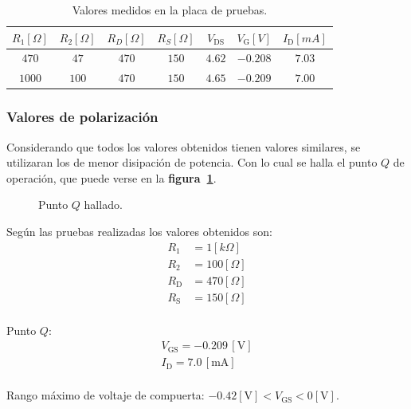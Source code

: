 \begin{table}[!h]
\begin{center}
    \begin{tabular}{|c|c|c|c||c||c|c|}
    \hline
    $R_1[\Omega]$ & $R_2[\Omega]$ & $R_D[\Omega]$ & $R_S[\Omega]$ &
    $V_{\text{DS}}$ & $V_{\text{G}}[V]$ & $I_{\text{D}}[mA]$
    \tabularnewline \hline \hline
    $ 470$ & $ 47$ & $470$ & $150$ & $4.62$ & $-0.208$ & $7.03$ \tabularnewline \hline
    $1000$ & $100$ & $470$ & $150$ & $4.65$ & $-0.209$ & $7.00$ \tabularnewline \hline
    \end{tabular}
\end{center}
\caption{Valores medidos en la placa de pruebas.}
\label{cuadro12}
\end{table}

\subsubsection{Valores de polarización}
Considerando que todos los valores obtenidos tienen valores similares, se
utilizaran los de menor disipación de potencia. Con lo cual se halla el punto
$Q$ de operación, que puede verse en la \textbf{figura~\ref{curva03}}.

\begin{figure}[!ht]
    \centering
    
    \caption{Punto $Q$ hallado.}
    \label{curva03}
\end{figure}

Según las pruebas realizadas los valores obtenidos son:
\begin{equation*}
    \begin{split}
        R_{\text{1}} &= 1[k\Omega]\\
        R_{\text{2}} &= 100[\Omega]\\
        R_{\text{D}} &= 470[\Omega]\\
        R_{\text{S}} &= 150[\Omega]\\
\end{split}
\end{equation*}

Punto $Q$:
\begin{equation*}
    \begin{split}
        V_{\text{GS}} = -0.209\,[\text{V}]\\
        I_{\text{D}} = 7.0\,[\text{mA}]\\
    \end{split}
\end{equation*}

Rango máximo de voltaje de compuerta: 
$-0.42[{\text{V}}] < V_{\text{GS}} < 0[{\text{V}}]$.

